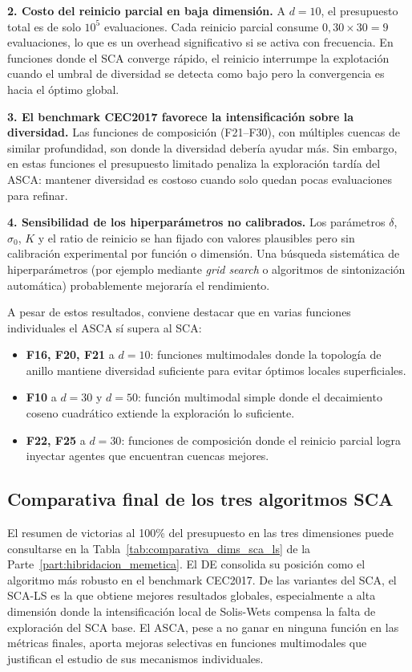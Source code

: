 \documentclass[12pt,a4paper]{article}
\begin{document}
\textbf{2. Costo del reinicio parcial en baja dimensión.} A $d=10$, el presupuesto total es de solo $10^5$ evaluaciones. Cada reinicio parcial consume $0{,}30 \times 30 = 9$ evaluaciones, lo que es un overhead significativo si se activa con frecuencia. En funciones donde el SCA converge rápido, el reinicio interrumpe la explotación cuando el umbral de diversidad se detecta como bajo pero la convergencia es hacia el óptimo global.
 
\textbf{3. El benchmark CEC2017 favorece la intensificación sobre la diversidad.} Las funciones de composición (F21--F30), con múltiples cuencas de similar profundidad, son donde la diversidad debería ayudar más. Sin embargo, en estas funciones el presupuesto limitado penaliza la exploración tardía del ASCA: mantener diversidad es costoso cuando solo quedan pocas evaluaciones para refinar.
 
\textbf{4. Sensibilidad de los hiperparámetros no calibrados.} Los parámetros $\delta$, $\sigma_0$, $K$ y el ratio de reinicio se han fijado con valores plausibles pero sin calibración experimental por función o dimensión. Una búsqueda sistemática de hiperparámetros (por ejemplo mediante \textit{grid search} o algoritmos de sintonización automática) probablemente mejoraría el rendimiento.
 
A pesar de estos resultados, conviene destacar que en varias funciones individuales el ASCA sí supera al SCA:
 
\begin{itemize}
  \item \textbf{F16, F20, F21} a $d=10$: funciones multimodales donde la topología de anillo mantiene diversidad suficiente para evitar óptimos locales superficiales.
  \item \textbf{F10} a $d=30$ y $d=50$: función multimodal simple donde el decaimiento coseno cuadrático extiende la exploración lo suficiente.
  \item \textbf{F22, F25} a $d=30$: funciones de composición donde el reinicio parcial logra inyectar agentes que encuentran cuencas mejores.
\end{itemize}
 
\subsection{Comparativa final de los tres algoritmos SCA}
 
El resumen de victorias al 100\% del presupuesto en las tres dimensiones puede consultarse en la Tabla~\ref{tab:comparativa_dims_sca_ls} de la Parte~\ref{part:hibridacion_memetica}. El DE consolida su posición como el algoritmo más robusto en el benchmark CEC2017. De las variantes del SCA, el SCA-LS es la que obtiene mejores resultados globales, especialmente a alta dimensión donde la intensificación local de Solis-Wets compensa la falta de exploración del SCA base. El ASCA, pese a no ganar en ninguna función en las métricas finales, aporta mejoras selectivas en funciones multimodales que justifican el estudio de sus mecanismos individuales.
 
\end{document}
